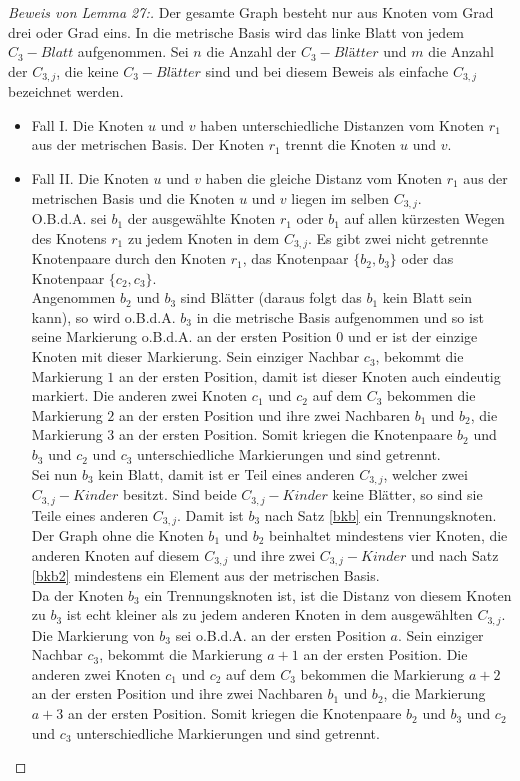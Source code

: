 \begin{proof}[Beweis von Lemma 27:]
Der gesamte Graph besteht nur aus Knoten vom Grad drei oder Grad eins. In die metrische Basis wird das linke Blatt von jedem $C_{3}-Blatt$ aufgenommen. Sei $n$ die Anzahl der $C_{3}-Blätter$ und $m$ die Anzahl der $C_{3,j}$, die keine $C_{3}-Blätter$ sind und bei diesem Beweis als einfache $C_{3,j}$ bezeichnet werden.
\begin{itemize}
\item Fall I. Die Knoten $u$ und $v$ haben unterschiedliche Distanzen vom Knoten $r_1$ aus der metrischen Basis. Der Knoten $r_1$ trennt die Knoten $u$ und $v$.
\item Fall II. Die Knoten $u$ und $v$ haben die gleiche Distanz vom Knoten $r_1$ aus der metrischen Basis und die Knoten $u$ und $v$ liegen im selben $C_{3,j}$.\\
O.B.d.A. sei $b_1$ der ausgewählte Knoten $r_1$ oder $b_1$ auf allen kürzesten Wegen des Knotens $r_1$ zu jedem Knoten in dem $C_{3,j}$. Es gibt zwei nicht getrennte Knotenpaare durch den Knoten $r_1$, das Knotenpaar $\{b_2,b_3\}$ oder das Knotenpaar $\{c_2,c_3\}$.\\
Angenommen $b_2$ und $b_3$ sind Blätter (daraus folgt das $b_1$ kein Blatt sein kann), so wird o.B.d.A. $b_3$ in die metrische Basis aufgenommen und so ist seine Markierung o.B.d.A. an der ersten Position $0$ und er ist der einzige Knoten mit dieser Markierung. Sein einziger Nachbar $c_3$, bekommt die Markierung $1$ an der ersten Position, damit ist dieser Knoten auch eindeutig markiert. Die anderen zwei Knoten $c_1$ und $c_2$ auf dem $C_3$ bekommen die Markierung $2$ an der ersten Position und ihre zwei Nachbaren $b_1$ und $b_2$, die Markierung $3$ an der ersten Position. Somit kriegen die Knotenpaare $b_2$ und $b_3$ und $c_2$ und $c_3$ unterschiedliche Markierungen und sind getrennt.\\ 	 
Sei nun $b_3$ kein Blatt, damit ist er Teil eines anderen $C_{3,j}$, welcher zwei $C_{3,j}-Kinder$ besitzt. Sind beide $C_{3,j}-Kinder$ keine Blätter, so sind sie Teile eines anderen $C_{3,j}$. Damit ist $b_3$ nach Satz \ref{bkb} ein Trennungsknoten. Der Graph ohne die Knoten $b_1$ und $b_2$ beinhaltet mindestens vier Knoten, die anderen Knoten auf diesem $C_{3,j}$ und ihre zwei $C_{3,j}-Kinder$ und nach Satz \ref{bkb2} mindestens ein Element aus der metrischen Basis.\\
Da der Knoten $b_3$ ein Trennungsknoten ist, ist die Distanz von diesem Knoten zu $b_3$ ist echt kleiner als zu jedem anderen Knoten in dem ausgewählten $C_{3,j}$. Die Markierung von $b_3$ sei o.B.d.A. an der ersten Position $a$. Sein einziger Nachbar $c_3$, bekommt die Markierung $a+1$ an der ersten Position. Die anderen zwei Knoten $c_1$ und $c_2$ auf dem $C_3$ bekommen die Markierung $a+2$ an der ersten Position und ihre zwei Nachbaren $b_1$ und $b_2$, die Markierung $a+3$ an der ersten Position. Somit kriegen die Knotenpaare $b_2$ und $b_3$ und $c_2$ und $c_3$ unterschiedliche Markierungen und sind getrennt.

\end{itemize}
\end{proof}
